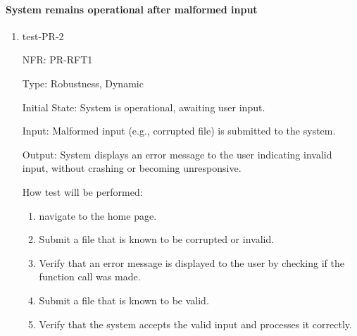 \documentclass[12pt, titlepage]{article}
\begin{document}
\paragraph{System remains operational after malformed input}
\begin{enumerate}
  \item{test-PR-2}

  NFR: PR-RFT1

  Type: Robustness, Dynamic
            
  Initial State: System is operational, awaiting user input.
            
  Input:  Malformed input (e.g., corrupted file) is submitted to the system.
            
  Output: System displays an error message to the user indicating invalid input, without crashing or becoming unresponsive.
            
  How test will be performed: 
  \begin{enumerate}
    \item navigate to the home page.
    \item Submit a file that is known to be corrupted or invalid.
    \item Verify that an error message is displayed to the user by checking if the function call was made.
    \item Submit a file that is known to be valid.
    \item Verify that the system accepts the valid input and processes it correctly.
  \end{enumerate}
\end{enumerate}
\end{document}
